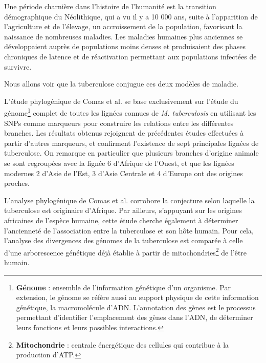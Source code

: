 \documentclass[twoside,a4paper,11pt,frenchb,openany]{report}
\begin{document}
Une période charnière dans l'histoire de l'humanité est la transition démographique du Néolithique, qui a vu il y a 10 000 ans, suite à l'apparition de l'agriculture et de l'élevage, un accroissement de la population, favorisant la naissance de nombreuses maladies. Les maladies humaines plus anciennes se développaient auprès de populations moins denses et produisaient des phases chroniques de latence et de réactivation permettant aux populations infectées de survivre.

Nous allons voir que la tuberculose conjugue ces deux modèles de maladie.


L'étude phylogénique de Comas et al.\cite{comas} se base exclusivement sur l'étude du génome\footnote{\textbf{Génome} : ensemble de l'information génétique d'un organisme. Par extension, le génome se réfère aussi au support physique de cette information génétique, la macromolécule d'ADN. L'annotation des gènes est le processus permettant d'identifier l'emplacement des gènes dans l'ADN, de déterminer leurs fonctions et leurs possibles interactions.} complet de toutes les lignées connues de \textit{M. tuberculosis} en utilisant les SNPs comme marqueurs pour construire les relations entre les différentes branches. Les résultats obtenus rejoignent de précédentes études effectuées à partir d'autres marqueurs, et confirment l'existence de sept principales lignées de tuberculose. On remarque en particulier que plusieurs branches d'origine animale se sont regroupées avec la lignée 6 d'Afrique de l'Ouest, et que les lignées modernes 2 d'Asie de l'Est, 3 d'Asie Centrale et 4 d'Europe ont des origines proches. 


L'analyse phylogénique de Comas et al. corrobore la conjecture selon laquelle la tuberculose est originaire d'Afrique. Par ailleurs, s'appuyant sur les origines africaines de l'espèce humaine, cette étude cherche également à déterminer l'ancienneté de l'association entre la tuberculose et son hôte humain. Pour cela, l'analyse des divergences des génomes de la tuberculose est comparée à celle d'une arborescence génétique déjà établie à partir de mitochondries\footnote{\textbf{Mitochondrie} : centrale énergétique des cellules qui contribue à la production d'ATP.} de l'être humain. 

\end{document}

